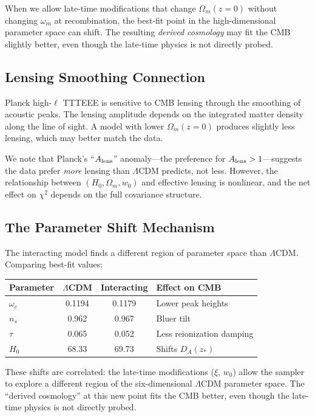 \documentclass[twocolumn,showpacs,preprintnumbers,amsmath,amssymb,prd]{revtex4-2}
\begin{document}
When we allow late-time modifications that change $\Omega_m(z=0)$ without changing $\omega_m$ at recombination, the best-fit point in the high-dimensional parameter space can shift. The resulting \textit{derived cosmology} may fit the CMB slightly better, even though the late-time physics is not directly probed.

\subsection{Lensing Smoothing Connection}

Planck high-$\ell$ TTTEEE is sensitive to CMB lensing through the smoothing of acoustic peaks. The lensing amplitude depends on the integrated matter density along the line of sight. A model with lower $\Omega_m(z=0)$ produces slightly less lensing, which may better match the data.

We note that Planck's ``$A_{\rm lens}$'' anomaly---the preference for $A_{\rm lens} > 1$---suggests the data prefer \textit{more} lensing than $\Lambda$CDM predicts, not less. However, the relationship between $(H_0, \Omega_m, w_0)$ and effective lensing is nonlinear, and the net effect on $\chi^2$ depends on the full covariance structure.

\subsection{The Parameter Shift Mechanism}

The interacting model finds a different region of parameter space than $\Lambda$CDM. Comparing best-fit values:

\begin{center}
\begin{tabular}{lccl}
\toprule
Parameter & $\Lambda$CDM & Interacting & Effect on CMB \\
\midrule
$\omega_c$ & 0.1194 & 0.1179 & Lower peak heights \\
$n_s$ & 0.962 & 0.967 & Bluer tilt \\
$\tau$ & 0.065 & 0.052 & Less reionization damping \\
$H_0$ & 68.33 & 69.73 & Shifts $D_A(z_*)$ \\
\bottomrule
\end{tabular}
\end{center}

These shifts are correlated: the late-time modifications ($\xi$, $w_0$) allow the sampler to explore a different region of the six-dimensional $\Lambda$CDM parameter space. The ``derived cosmology'' at this new point fits the CMB better, even though the late-time physics is not directly probed.
\end{document}
